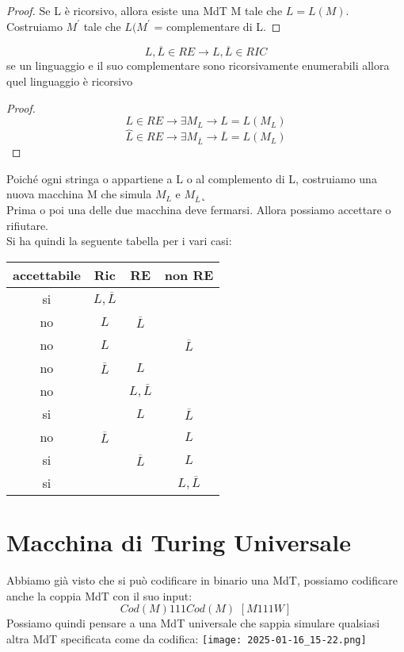 	\begin{proof}
		Se L è ricorsivo, allora esiste una MdT M tale che $L = L(M)$. Costruiamo $M^{'}$ tale che
		$L(M^{'}$ = complementare di L.
	\end{proof}
	\begin{theorem}
		$$L,\overline{L}\in RE\to L,\overline{L}\in RIC$$
		se un linguaggio e il suo complementare sono ricorsivamente enumerabili allora quel linguaggio è ricorsivo
	\end{theorem}
	\begin{proof}
		$$L\in RE\to \exists M_L\to L=L(M_L)$$
		$$\overbrace{L}\in RE\to \exists M_{\overline{L}}\to \overline{L}=L(M_L)$$
	\end{proof}
	Poiché ogni stringa o appartiene a L o al complemento di L, costruiamo una nuova macchina M che
	simula $M_L$ e $M_{\overline{L}}$˛\\Prima o poi una delle due macchina deve fermarsi. Allora possiamo accettare o rifiutare.\\
	Si ha quindi la seguente tabella per i vari casi:
	\begin{center}
		\begin{tabular}{c c c c }
			accettabile & Ric              & RE               & non RE           \\
			\hline
			si          & $L,\overline{L}$ &                  &                  \\
			no          & $L$              & $\overline{L}$   &                  \\
			no          & $L$              &                  & $\overline{L}$   \\
			no          & $\overline{L}$   & $L$              &                  \\
			no          &                  & $L,\overline{L}$ &                  \\
			si          &                  & $L$              & $\overline{L}$   \\
			no          & $\overline{L}$   &                  & $L$              \\
			si          &                  & $\overline{L}$   & $L$              \\
			si          &                  &                  & $L,\overline{L}$ \\
		\end{tabular}
	\end{center}
	\section{Macchina di Turing Universale}
	Abbiamo già visto che si può codificare in binario una MdT, possiamo codificare anche la coppia
	MdT con il suo input:
	$$Cod(M)111Cod(M)\,\,[M111W]$$Possiamo quindi pensare a una MdT universale che sappia simulare qualsiasi altra MdT specificata come da codifica:
			\texttt{[image: 2025-01-16\_15-22.png]}

